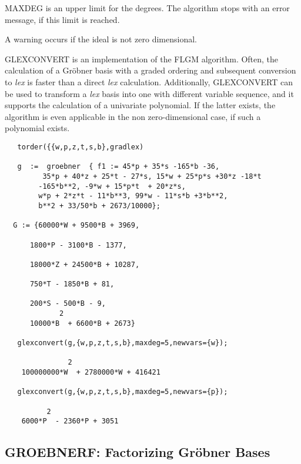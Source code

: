 \documentclass[11pt,letterpaper]{book}
\begin{document}
MAXDEG is an upper limit for the degrees.  The algorithm stops with
an error message, if this limit is reached.

A warning occurs if the ideal is not zero dimensional.

GLEXCONVERT is an implementation of the FLGM algorithm.   Often, the
calculation of a Gr\"obner basis
with a graded ordering and subsequent conversion to {\it lex} is
faster than a direct {\it lex} calculation.   Additionally, GLEXCONVERT
can be used to transform a {\it lex} basis into one with different
variable sequence, and it supports the calculation of a univariate
polynomial.  If the latter exists, the algorithm is even applicable in
the non zero-dimensional case, if such a polynomial exists.

{\small\begin{verbatim}
   torder({{w,p,z,t,s,b},gradlex)

   g  :=  groebner  { f1 := 45*p + 35*s -165*b -36,
         35*p + 40*z + 25*t - 27*s, 15*w + 25*p*s +30*z -18*t
        -165*b**2, -9*w + 15*p*t  + 20*z*s,
        w*p + 2*z*t - 11*b**3, 99*w - 11*s*b +3*b**2,
        b**2 + 33/50*b + 2673/10000};

  G := {60000*W + 9500*B + 3969,

      1800*P - 3100*B - 1377,

      18000*Z + 24500*B + 10287,

      750*T - 1850*B + 81,

      200*S - 500*B - 9,
             2
      10000*B  + 6600*B + 2673}

   glexconvert(g,{w,p,z,t,s,b},maxdeg=5,newvars={w});

               2
    100000000*W  + 2780000*W + 416421

   glexconvert(g,{w,p,z,t,s,b},maxdeg=5,newvars={p});

          2
    6000*P  - 2360*P + 3051

\end{verbatim}}

\subsection{GROEBNERF: Factorizing Gr\"obner Bases}
\end{document}
